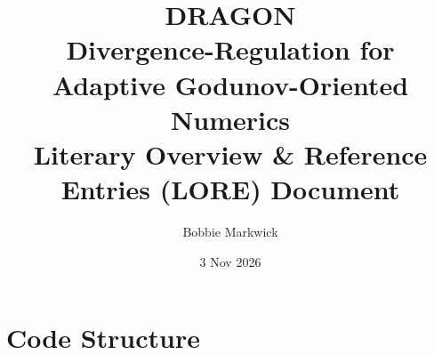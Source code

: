 \documentclass[11pt]{report}
\title{\textbf{DRAGON}\\ Divergence-Regulation for Adaptive Godunov-Oriented Numerics\\ Literary Overview \& Reference Entries (LORE) Document}
\author{Bobbie Markwick}
\date{3 Nov 2026}
\begin{document}
\maketitle


\tableofcontents

\clearpage
{}
\setcounter{page}{1}







\chapter{Code Structure}
\label{ch:code}
\end{document}

